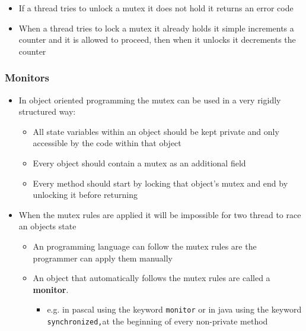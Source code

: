 \documentclass[11pt]{article}
\providecommand{\tightlist}{%
      \setlength{\itemsep}{0pt}\setlength{\parskip}{0pt}}
\begin{document}
\begin{itemize}
\begin{itemize}
    \begin{itemize}
    \tightlist
    \item
      If a thread tries to unlock a mutex it does not hold it returns an
      error code
    \item
      When a thread tries to lock a mutex it already holds it simple
      increments a counter and it is allowed to proceed, then when it
      unlocks it decrements the counter
    \end{itemize}
  \end{itemize}
\end{itemize}

    \subsubsection{Monitors}\label{monitors}

\begin{itemize}
\tightlist
\item
  In object oriented programming the mutex can be used in a very rigidly
  structured way:

  \begin{itemize}
  \tightlist
  \item
    All state variables within an object should be kept private and only
    accessible by the code within that object
  \item
    Every object should contain a mutex as an additional field
  \item
    Every method should start by locking that object's mutex and end by
    unlocking it before returning
  \end{itemize}
\item
  When the mutex rules are applied it will be impossible for two thread
  to race an objects state

  \begin{itemize}
  \tightlist
  \item
    An programming language can follow the mutex rules are the
    programmer can apply them manually
  \item
    An object that automatically follows the mutex rules are called a
    \textbf{monitor}.

    \begin{itemize}
    \tightlist
    \item
      e.g. in pascal using the keyword \texttt{monitor} or in java using
      the keyword \texttt{synchronized,}at the beginning of every
      non-private method
    \end{itemize}
  \end{itemize}
\end{itemize}
\end{document}
